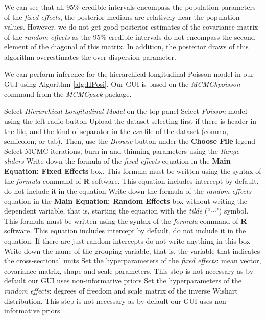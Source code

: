 We can see that all 95\% credible intervals encompass the population parameters of the \textit{fixed effects}, the posterior medians are relatively near the population values. However, we do not get good posterior estimates of the covariance matrix of the \textit{random effects} as the 95\% credible intervals do not encompass the second element of the diagonal of this matrix. In addition, the posterior draws of this algorithm overestimates the over-dispersion parameter.

We can perform inference for the hierarchical longitudinal Poisson model in our GUI using Algorithm \ref{alg:HPosi}. Our GUI is based on the \textit{MCMChpoisson} command from the \textit{MCMCpack} package.

\begin{algorithm}[h!]
	\caption{Hierarchical longitudinal Poisson models}\label{alg:HPosi}
	\begin{algorithmic}[1]  		 			
		\State Select \textit{Hierarchical Longitudinal Model} on the top panel
		\State Select \textit{Poisson} model using the left radio button
		\State Upload the dataset selecting first if there is header in the file, and the kind of separator in the \textit{csv} file of the dataset (comma, semicolon, or tab). Then, use the \textit{Browse} button under the \textbf{Choose File} legend
		\State Select MCMC iterations, burn-in and thinning parameters using the \textit{Range sliders}
		\State Write down the formula of the \textit{fixed effects} equation in the \textbf{Main Equation: Fixed Effects} box. This formula must be written using the syntax of the \textit{formula} command of \textbf{R} software. This equation includes intercept by default, do not include it in the equation
		\State Write down the formula of the \textit{random effects} equation in the \textbf{Main Equation: Random Effects} box without writing the dependent variable, that is, starting the equation with the \textit{tilde} (``$\sim$") symbol. This formula must be written using the syntax of the \textit{formula} command of \textbf{R} software. This equation includes intercept by default, do not include it in the equation. If there are just random intercepts do not write anything in this box
		\State Write down the name of the grouping variable, that is, the variable that indicates the cross-sectional units 
		\State Set the hyperparameters of the \textit{fixed effects}: mean vector, covariance matrix, shape and scale parameters. This step is not necessary as by default our GUI uses non-informative priors
		\State Set the hyperparameters of the \textit{random effects}: degrees of freedom and scale matrix of the inverse Wishart distribution. This step is not necessary as by default our GUI uses non-informative priors

\end{algorithmic}
\end{algorithm}
